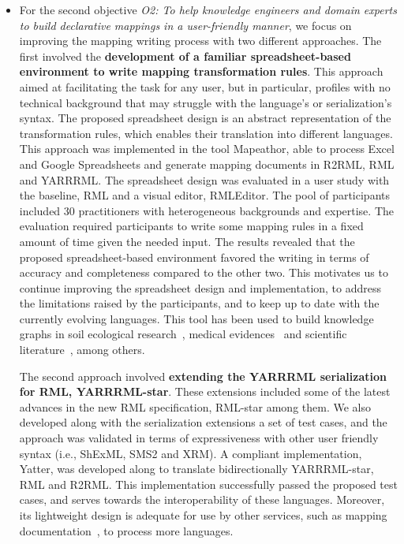 \begin{itemize}
    \item For the second objective \textit{O2: To help knowledge engineers and domain experts to build declarative mappings in a user-friendly manner}, we focus on improving the mapping writing process with two different approaches. 
    The first involved the \textbf{ development of a familiar spreadsheet-based environment to write mapping transformation rules}. 
    This approach aimed at facilitating the task for any user, but in particular, profiles with no technical background that may struggle with the language's or serialization's syntax. 
    The proposed spreadsheet design is an abstract representation of the transformation rules, which enables their translation into different languages. 
    This approach was implemented in the tool Mapeathor, able to process Excel and Google Spreadsheets and generate mapping documents in R2RML, RML and YARRRML. 
    The spreadsheet design was evaluated in a user study with the baseline, RML and a visual editor, RMLEditor. 
    The pool of participants included 30 practitioners with heterogeneous backgrounds and expertise.
    The evaluation required participants to write some mapping rules in a fixed amount of time given the needed input. 
    The results revealed that the proposed spreadsheet-based environment favored the writing in terms of accuracy and completeness compared to the other two.
    This motivates us to continue improving the spreadsheet design and implementation, to address the limitations raised by the participants, and to keep up to date with the currently evolving languages. This tool has been used to build knowledge graphs in soil ecological research~\parencite{leguillarme2023soil}, medical evidences~\parencite{perez2022eboca} and scientific literature~\parencite{badenes2023lessons}, among others.
    
    The second approach involved \textbf{extending the YARRRML serialization for RML, YARRRML-star}. 
    These extensions included some of the latest advances in the new RML specification, RML-star among them. 
    We also developed along with the serialization extensions a set of test cases, and the approach was validated in terms of expressiveness with other user friendly syntax (i.e., ShExML, SMS2 and XRM). 
    A compliant implementation, Yatter, was developed along to translate bidirectionally YARRRML-star, RML and R2RML. 
    This implementation successfully passed the proposed test cases, and serves towards the interoperability of these languages. 
    Moreover, its lightweight design is adequate for use by other services, such as mapping documentation~\parencite{toledo2024rmldoc}, to process more languages. 
    

\end{itemize}
